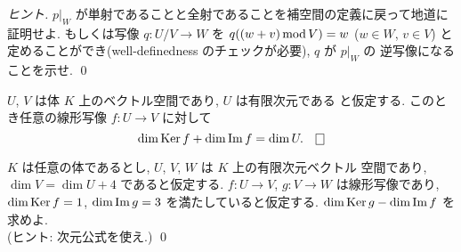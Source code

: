 \documentclass[12pt,twoside]{jarticle}
\begin{document}
\begin{proof}[ヒント]
  $p|_W$ が単射であることと全射であることを補空間の定義に戻って地道に
  証明せよ.
  もしくは写像 $q:U/V\to W$ を $q((w+v)\mathop{\mathrm{mod}}\nolimits V) = w$ ($w\in W$, $v\in V$) 
  と定めることができ(well-definedness のチェックが必要), $q$ が $p|_W$ の
  逆写像になることを示せ. \qed
\end{proof}


\begin{question}
  $U$, $V$ は体 $K$ 上のベクトル空間であり, $U$ は有限次元である
  と仮定する. このとき任意の線形写像 $f:U\to V$ に対して %
  \begin{equation*}
   \dim\Ker f + \dim\Image f = \dim U. \qed
  \end{equation*}
\end{question}



\begin{question}[5点]
$K$ は任意の体であるとし, $U$, $V$, $W$ は $K$ 上の有限次元ベクトル
空間であり, $\dim V = \dim U + 4$ であると仮定する.
$f:U\to V$, $g:V\to W$ は線形写像であり, $\dim\mathop{\mathrm{Ker}}\nolimits f = 1$, $\dim\mathop{\mathrm{Im}}\nolimits g = 3$ 
を満たしていると仮定する.
$\dim\mathop{\mathrm{Ker}}\nolimits g - \dim\mathop{\mathrm{Im}}\nolimits f$ を求めよ. 
\\(ヒント: 次元公式を使え.)
\qed 
\end{question}

\end{document}
